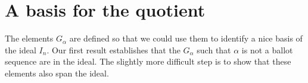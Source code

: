\documentclass[11pt]{amsart}
\newcommand{\defncolor}{\color{darkred}}
\newcommand{\defn}[1]{{\defncolor\emph{#1}}} %
\theoremstyle{definition}
\newtheorem{example}[theorem]{Example}
\numberwithin{equation}{section}
\newcommand{\mike}[1]{\todo[size=\tiny,color=lime!30]{#1 \\ \hfill --- Mike}}
\begin{document}
\section{A basis for the quotient}\label{sec:ballotbasis}

%

The elements $G_\alpha$ are defined so that we could use them to
identify a nice basis of the ideal $I_n$.  Our first result establishes
that the $G_\alpha$ such that $\alpha$ is not a ballot sequence
are in the ideal.  The slightly more difficult step is to show
that these elements also span the ideal.
\end{document}
